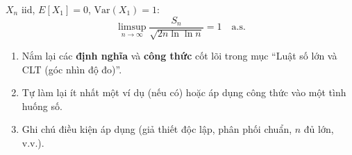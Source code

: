 \documentclass[12pt,a4paper]{article}
\begin{document}
\begin{dinhly}[title={Luật logarit lặp (Hartman--Wintner)}]
  $X_n$ iid, $E[X_1] = 0$, $\text{Var}(X_1) = 1$:
  \[
    \limsup_{n \to \infty} \frac{S_n}{\sqrt{2n\ln\ln n}} = 1 \quad\text{a.s.}
  \]
\end{dinhly}

\begin{tongket}[title={Tổng kết: Luật số lớn và CLT (góc nhìn độ đo)}]
\begin{enumerate}
  \item Nắm lại các \textbf{định nghĩa} và \textbf{công thức} cốt lõi trong mục ``Luật số lớn và CLT (góc nhìn độ đo)''.
  \item Tự làm lại ít nhất một ví dụ (nếu có) hoặc áp dụng công thức vào một tình huống số.
  \item Ghi chú điều kiện áp dụng (giả thiết độc lập, phân phối chuẩn, $n$ đủ lớn, v.v.).
\end{enumerate}
\end{tongket}
\end{document}
